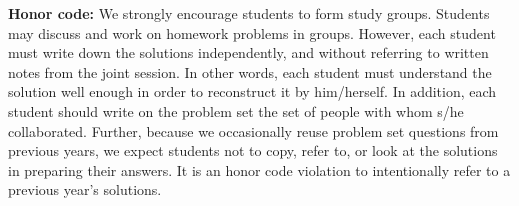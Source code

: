 {\bf Honor code:} We strongly encourage students to form study
groups. Students may discuss and work on homework problems in
groups. However, each student must write down the solutions independently,
and without referring to written notes from the joint session. In other
words, each student must understand the solution well enough in order to
reconstruct it by him/herself. In addition, each student should write on
the problem set the set of people with whom s/he collaborated.
Further, because we occasionally reuse problem set questions from previous
years, we expect students not to copy, refer to, or look at the solutions
in preparing their answers. It is an honor code violation to intentionally
refer to a previous year's solutions.
